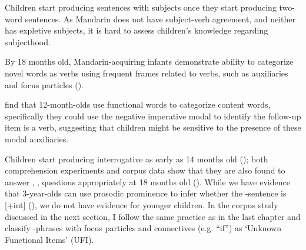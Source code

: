  Children start producing sentences with subjects once they start producing two-word sentences. As Mandarin does not have subject-verb agreement, and neither has expletive subjects, it is hard to assess children's knowledge regarding subjecthood. %

 By 18 months old, Mandarin-acquiring infants demonstrate ability to categorize novel words as verbs using frequent frames related to verbs, such as auxiliaries and focus particles (\cite{zhangshili2015infant}).

  \cite{zhangshili2015infant} find that 12-month-olds use functional words to categorize content words, specifically they could use the negative imperative modal  to identify the follow-up item is a verb, suggesting that children might be sensitive to the presence of these modal auxiliaries.  %


 Children start producing interrogative \twh{} as early as 14 months old (\cite{lee1989acq, fan2012, linjing2014}); both comprehension experiments and corpus data show that they are also found to answer , ,  questions appropriately at 18 months old (\citealt{fan2012,moradlou2020}). While we have evidence that 3-year-olds can use prosodic prominence to infer whether the \twh-sentence is [+int] (\cite{WHanything}), we do not have evidence for younger children. In the corpus study discussed in the next section, I follow the same practice as in the last chapter and classify \twh-phrases with focus particles and connectives (e.g.  ``if'') as `Unknown Functional Items' (UFI).

